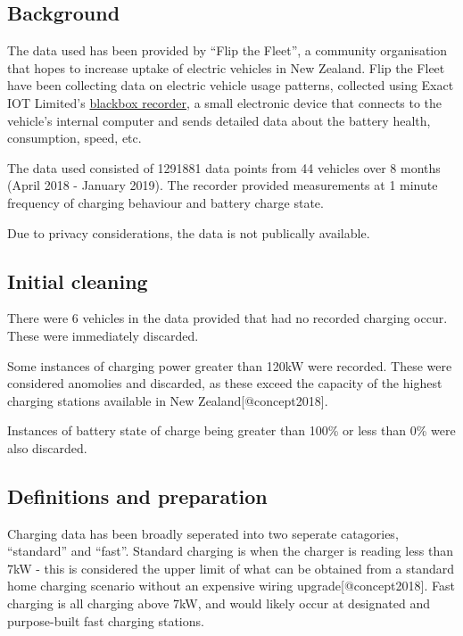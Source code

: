 \documentclass[]{article}
\begin{document}
\subsection{Background}\label{background}

The data used has been provided by ``Flip the Fleet'', a community
organisation that hopes to increase uptake of electric vehicles in New
Zealand. Flip the Fleet have been collecting data on electric vehicle
usage patterns, collected using Exact IOT Limited's
\href{https://flipthefleet.org/ev-black-box/}{blackbox recorder}, a
small electronic device that connects to the vehicle's internal computer
and sends detailed data about the battery health, consumption, speed,
etc.

The data used consisted of 1291881 data points from 44 vehicles over 8
months (April 2018 - January 2019). The recorder provided measurements
at 1 minute frequency of charging behaviour and battery charge state.

Due to privacy considerations, the data is not publically available.

\subsection{Initial cleaning}\label{initial-cleaning}

There were 6 vehicles in the data provided that had no recorded charging
occur. These were immediately discarded.

Some instances of charging power greater than 120kW were recorded. These
were considered anomolies and discarded, as these exceed the capacity of
the highest charging stations available in New
Zealand{[}@concept2018{]}.

Instances of battery state of charge being greater than 100\% or less
than 0\% were also discarded.

\subsection{Definitions and
preparation}\label{definitions-and-preparation}

Charging data has been broadly seperated into two seperate catagories,
``standard'' and ``fast''. Standard charging is when the charger is
reading less than 7kW - this is considered the upper limit of what can
be obtained from a standard home charging scenario without an expensive
wiring upgrade{[}@concept2018{]}. Fast charging is all charging above
7kW, and would likely occur at designated and purpose-built fast
charging stations.
\end{document}
